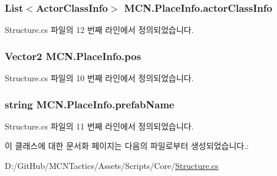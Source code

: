 \subsubsection[{\texorpdfstring{actor\+Class\+Info}{actorClassInfo}}]{\setlength{\rightskip}{0pt plus 5cm}List$<${\bf Actor\+Class\+Info}$>$ M\+C\+N.\+Place\+Info.\+actor\+Class\+Info}\hypertarget{class_m_c_n_1_1_place_info_a53e63fce0254eb635a1c6a302bce97d1}{}\label{class_m_c_n_1_1_place_info_a53e63fce0254eb635a1c6a302bce97d1}


Structure.\+cs 파일의 12 번째 라인에서 정의되었습니다.

\subsubsection[{\texorpdfstring{pos}{pos}}]{\setlength{\rightskip}{0pt plus 5cm}Vector2 M\+C\+N.\+Place\+Info.\+pos}\hypertarget{class_m_c_n_1_1_place_info_ab61c1f49a0d342fb132a2af87ee7c322}{}\label{class_m_c_n_1_1_place_info_ab61c1f49a0d342fb132a2af87ee7c322}


Structure.\+cs 파일의 10 번째 라인에서 정의되었습니다.

\subsubsection[{\texorpdfstring{prefab\+Name}{prefabName}}]{\setlength{\rightskip}{0pt plus 5cm}string M\+C\+N.\+Place\+Info.\+prefab\+Name}\hypertarget{class_m_c_n_1_1_place_info_aedf20cfad59c8298386c61bdcc266457}{}\label{class_m_c_n_1_1_place_info_aedf20cfad59c8298386c61bdcc266457}


Structure.\+cs 파일의 11 번째 라인에서 정의되었습니다.



이 클래스에 대한 문서화 페이지는 다음의 파일로부터 생성되었습니다.\+:\begin{DoxyCompactItemize}
\item 
D\+:/\+Git\+Hub/\+M\+C\+N\+Tactics/\+Assets/\+Scripts/\+Core/\hyperlink{_structure_8cs}{Structure.\+cs}\end{DoxyCompactItemize}
